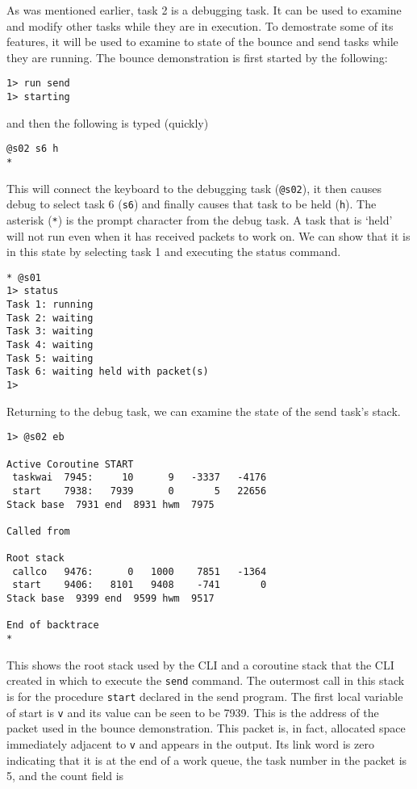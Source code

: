      As was mentioned earlier, task 2 is a debugging task.  It can be
used to examine and modify other tasks while they are in execution.
To demostrate some of its features, it will be used to examine to
state of the bounce and send tasks while they are running.  The bounce
demonstration is first started by the following:
\begin{verbatim}
1> run send
1> starting
\end{verbatim}
\noindent
and then the following is typed (quickly)
\begin{verbatim}
@s02 s6 h
*
\end{verbatim}
This will connect the keyboard to the debugging task (\verb|@s02|), it
then causes debug to select task 6 (\verb|s6|) and finally causes that
task to be held (\verb|h|).  The asterisk (\verb|*|) is the prompt
character from the debug task.  A task that is `held' will not run
even when it has received packets to work on.  We can show that it is
in this state by selecting task 1 and executing the status command.
\begin{verbatim}
* @s01
1> status
Task 1: running
Task 2: waiting
Task 3: waiting
Task 4: waiting
Task 5: waiting
Task 6: waiting held with packet(s)
1>
\end{verbatim}
Returning to the debug task, we can examine the state of the send
task's stack.
\begin{verbatim}
1> @s02 eb

Active Coroutine START
 taskwai  7945:     10      9   -3337   -4176
 start    7938:   7939      0       5   22656
Stack base  7931 end  8931 hwm  7975

Called from

Root stack
 callco   9476:      0   1000    7851   -1364
 start    9406:   8101   9408    -741       0
Stack base  9399 end  9599 hwm  9517

End of backtrace
*
\end{verbatim}
This shows the root stack used by the CLI and a coroutine stack that
the CLI created in which to execute the \verb|send| command.  The
outermost call in this stack is for the procedure \verb|start|
declared in the send program.  The first local variable of start is
\verb|v| and its value can be seen to be 7939.  This is the address of
the packet used in the bounce demonstration.  This packet is, in fact,
allocated space immediately adjacent to \verb|v| and appears in the
output.  Its link word is zero indicating that it is at the end of a
work queue, the task number in the packet is 5, and the count field is
